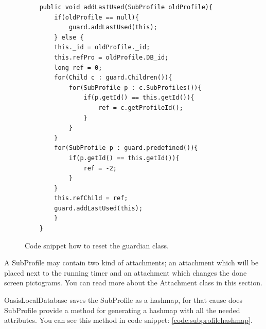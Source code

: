 \begin{description}
\begin{figure}[H]
\begin{lstlisting}
	public void addLastUsed(SubProfile oldProfile){
		if(oldProfile == null){
			guard.addLastUsed(this);
		} else {
		this._id = oldProfile._id;
		this.refPro = oldProfile.DB_id;
		long ref = 0;
		for(Child c : guard.Children()){
			for(SubProfile p : c.SubProfiles()){
				if(p.getId() == this.getId()){
					ref = c.getProfileId();
				}
			}
		}
		for(SubProfile p : guard.predefined()){
			if(p.getId() == this.getId()){
				ref = -2;
			}
		}
		this.refChild = ref;
		guard.addLastUsed(this);
		}
	}
\end{lstlisting}
\caption{Code snippet how to reset the guardian class.}%
\label{code:addlastused}%
\end{figure}
	
	A SubProfile may contain two kind of attachments; an attachment which will be placed next to the running timer and an attachment which changes the done screen pictograms. You can read more about the Attachment class in this section.
	
	OasisLocalDatabase saves the SubProfile as a hashmap, for that cause does SubProfile provide a method for generating a hashmap with all the needed attributes. You can see this method in code snippet: \ref{code:subprofilehashmap}.
	

\end{description}
